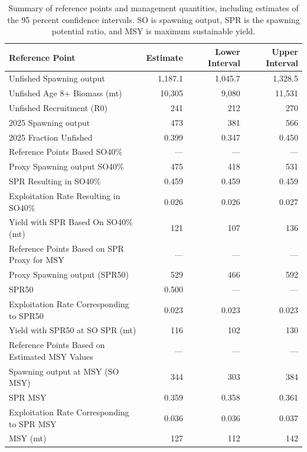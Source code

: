 \documentclass[
]{scrartcl}
\begin{document}
\begin{longtable}{lrrr}

\caption{\label{tbl-ref-points-es-2}Summary of reference points and
management quantities, including estimates of the 95 percent confidence
intervals. SO is spawning output, SPR is the spawning potential ratio,
and MSY is maximum sustainable yield.}

\tabularnewline

\toprule
Reference Point & Estimate & Lower Interval & Upper Interval \\ 
\midrule\addlinespace[2.5pt]
Unfished Spawning output & 1,187.1 & 1,045.7 & 1,328.5 \\ 
Unfished Age 8+ Biomass (mt) & 10,305 & 9,080 & 11,531 \\ 
Unfished Recruitment (R0) & 241 & 212 & 270 \\ 
2025 Spawning output & 473 & 381 & 566 \\ 
2025 Fraction Unfished & 0.399 & 0.347 & 0.450 \\ 
Reference Points Based SO40\% & — & — & — \\ 
Proxy Spawning output SO40\% & 475 & 418 & 531 \\ 
SPR Resulting in SO40\% & 0.459 & 0.459 & 0.459 \\ 
Exploitation Rate Resulting in SO40\% & 0.026 & 0.026 & 0.027 \\ 
Yield with SPR Based On SO40\% (mt) & 121 & 107 & 136 \\ 
Reference Points Based on SPR Proxy for MSY & — & — & — \\ 
Proxy Spawning output (SPR50) & 529 & 466 & 592 \\ 
SPR50 & 0.500 & — & — \\ 
Exploitation Rate Corresponding to SPR50 & 0.023 & 0.023 & 0.023 \\ 
Yield with SPR50 at SO SPR (mt) & 116 & 102 & 130 \\ 
Reference Points Based on Estimated MSY Values & — & — & — \\ 
Spawning output at MSY (SO MSY) & 344 & 303 & 384 \\ 
SPR MSY & 0.359 & 0.358 & 0.361 \\ 
Exploitation Rate Corresponding to SPR MSY & 0.036 & 0.036 & 0.037 \\ 
MSY (mt) & 127 & 112 & 142 \\ 
\bottomrule

\end{longtable}

\endgroup
\end{document}
